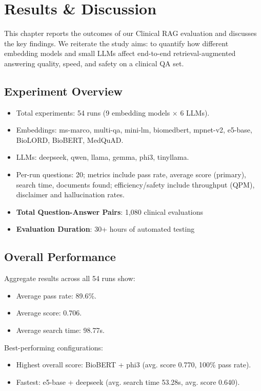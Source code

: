 \chapter{Results \& Discussion}
\label{chap:results}

\noindent This chapter reports the outcomes of our Clinical RAG evaluation and discusses the key findings. We reiterate the study aims: to quantify how different embedding models and small LLMs affect end-to-end retrieval-augmented answering quality, speed, and safety on a clinical QA set.

\section{Experiment Overview}
\begin{itemize}
  \item Total experiments: 54 runs (9 embedding models \(\times\) 6 LLMs).
  \item Embeddings: ms-marco, multi-qa, mini-lm, biomedbert, mpnet-v2, e5-base, BioLORD, BioBERT, MedQuAD.
  \item LLMs: deepseek, qwen, llama, gemma, phi3, tinyllama.
  \item Per-run questions: 20; metrics include pass rate, average score (primary), search time, documents found; efficiency/safety include throughput (QPM), disclaimer and hallucination rates.
  \item \textbf{Total Question-Answer Pairs}: 1,080 clinical evaluations
  \item \textbf{Evaluation Duration}: 30+ hours of automated testing
\end{itemize}

\section{Overall Performance}
Aggregate results across all 54 runs show:
\begin{itemize}
  \item Average pass rate: 89.6\%.
  \item Average score: 0.706.
  \item Average search time: 98.77s.
\end{itemize}

Best-performing configurations:
\begin{itemize}
  \item Highest overall score: BioBERT + phi3 (avg. score 0.770, 100\% pass rate).
  \item Fastest: e5-base + deepseek (avg. search time 53.28s, avg. score 0.640).
\end{itemize}

